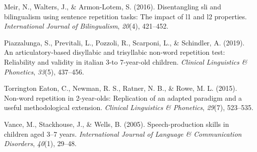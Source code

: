 \documentclass[english,,man,floatsintext]{apa6}
\begin{document}
\leavevmode\hypertarget{ref-meir2016disentangling}{}%
Meir, N., Walters, J., \& Armon-Lotem, S. (2016). Disentangling sli and bilingualism using sentence repetition tasks: The impact of l1 and l2 properties. \emph{International Journal of Bilingualism}, \emph{20}(4), 421--452.

\leavevmode\hypertarget{ref-piazzalunga2019articulatory}{}%
Piazzalunga, S., Previtali, L., Pozzoli, R., Scarponi, L., \& Schindler, A. (2019). An articulatory-based disyllabic and trisyllabic non-word repetition test: Reliability and validity in italian 3-to 7-year-old children. \emph{Clinical Linguistics \& Phonetics}, \emph{33}(5), 437--456.

\leavevmode\hypertarget{ref-torrington2015non}{}%
Torrington Eaton, C., Newman, R. S., Ratner, N. B., \& Rowe, M. L. (2015). Non-word repetition in 2-year-olds: Replication of an adapted paradigm and a useful methodological extension. \emph{Clinical Linguistics \& Phonetics}, \emph{29}(7), 523--535.

\leavevmode\hypertarget{ref-vance2005speech}{}%
Vance, M., Stackhouse, J., \& Wells, B. (2005). Speech-production skills in children aged 3--7 years. \emph{International Journal of Language \& Communication Disorders}, \emph{40}(1), 29--48.
\end{document}

